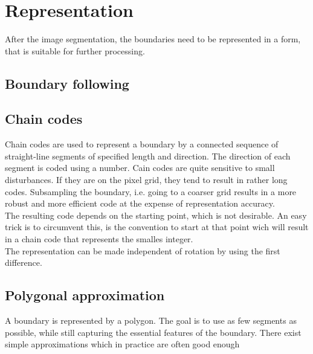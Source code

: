 \section{Representation}
After the image segmentation, the boundaries need to be represented in a form, that is suitable for further processing.
\subsection{Boundary following}
\subsection{Chain codes}
Chain codes are used to represent a boundary by a connected sequence of straight-line segments of specified length and direction. The direction of each segment is coded using a number.
Cain codes are quite sensitive to small disturbances. If they are on the pixel grid, they tend to result in rather long codes. Subsampling the boundary, i.e. going to a coarser grid results in a more robust and more efficient code at the expense of representation accuracy.\\
The resulting code depends on the starting point, which is not desirable. An easy trick is to circumvent this, is the convention to start at that point wich will result in a chain code that represents the smalles integer.\\
The representation can be made independent of rotation by using the first difference.
\subsection{Polygonal approximation}
A boundary is represented by a polygon. The goal is to use as few segments as possible, while still capturing the essential features of the boundary. There exist simple approximations which in practice are often good enough\\
